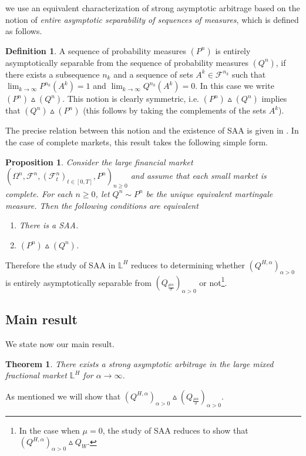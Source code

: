\documentclass[reqno,a4paper]{amsart}
\theoremstyle{plain}
\newtheorem{theorem}{Theorem}
\theoremstyle{definition}
\newtheorem{definition}{Definition}
\theoremstyle{plain}
\newtheorem{proposition}{Proposition}
\theoremstyle{plain}
\theoremstyle{plain}
\begin{document}
we use an equivalent characterization of strong asymptotic arbitrage based on the notion of \textit{entire asymptotic separability of sequences of measures}, which is defined as follows.
\begin{definition}\label{asymsep}
A sequence of probability measures ${(P^n)}$ is entirely asymptotically separable from the sequence of probability measures ${(Q^n)}$, if
there exists a subsequence $n_k$ and a sequence of sets $A^k\in\mathcal{F}^{n_k}$ such that $\lim_{k\to\infty}P^{n_k}(A^{k})=1$
and $\lim_{k\to\infty}Q^{n_k}(A^k)=0$. In this case we write $(P^n)\vartriangle(Q^n)$. This notion is clearly symmetric, i.e. $(P^n)\vartriangle(Q^n)$ implies that  $(Q^n)\vartriangle(P^n)$ (this follows by taking the complements of the sets $A^k$).
\end{definition}
The precise relation between this notion and the existence of SAA is given in \cite[Proposition 4]{Kakra}. In the case of complete markets, this result takes the following simple form.
\begin{proposition}\label{pkk}
Consider the large financial market $(\Omega^n,{{\mathcal F}}^n,({{\mathcal F}}_t^n)_{t\in[0,T]}, P^n)_{n\geq 0}$ and assume that each small market is complete. For each $n\geq 0$, let $Q^n\sim P^n$ be the unique equivalent martingale measure. Then the following conditions are equivalent
\begin{enumerate}
\item There is a SAA.
 \item $(P^n)\vartriangle(Q^n)$.
  \end{enumerate}
\end{proposition}
Therefore the study of SAA in ${{\mathbb L}}^H$ reduces to determining whether $(Q^{H,\alpha})_{\alpha>0}$ is entirely asymptotically separable from $(Q_{\frac{\mu\alpha}{\sigma}})_{\alpha>0}$ or not\footnote{In the case when $\mu=0$, the study of SAA reduces to show that $(Q^{H,\alpha})_{\alpha>0}\vartriangle Q_W$.}.

\subsection{Main result}\label{S1.3}
We state now our main result.
\begin{theorem}\label{t1}
There exists a strong asymptotic arbitrage in the large mixed fractional market ${{\mathbb L}}^H$ for $\alpha\to\infty$.
\end{theorem}
As mentioned we will show that $(Q^{H,\alpha})_{\alpha>0}\vartriangle (Q_{\frac{\mu\alpha}{\sigma}})_{\alpha>0}$.
\end{document}
